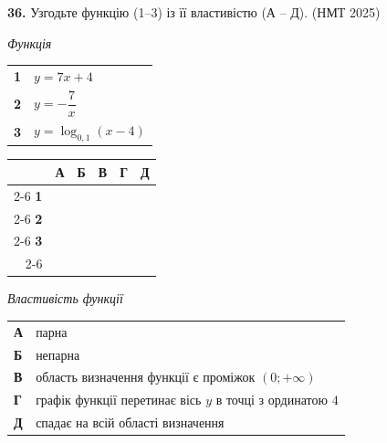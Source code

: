 \documentclass[14pt]{extarticle}
\newcommand{\nmtyear}[1]{\hfill{\small\color{yearcolor}(НМТ #1)}}
\begin{document}
\vspace{0.7cm}

\noindent\textbf{36.} Узгодьте функцію (1–3) із її властивістю (А – Д). \nmtyear{2025}

\vspace{0.3cm}

\noindent
\begin{minipage}[t]{0.45\textwidth}
    \textit{Функція} \par \vspace{0.2cm}
    \begin{tabular}{@{}p{0.5cm} p{5cm}@{}}
    \textbf{1} & $y=7x+4$ \\[0.3cm]
    \textbf{2} & $y=-\dfrac{7}{x}$ \\[0.3cm]
    \textbf{3} & $y=\log_{0{,}1}(x-4)$ \\
    \end{tabular}
    
    \vspace{0.5cm}
    
    \begingroup
    \setlength{\tabcolsep}{4pt}
    \renewcommand{\arraystretch}{1.2}
    \small
    \begin{tabular}{r|c|c|c|c|c|}
         \multicolumn{1}{c}{} & \multicolumn{1}{c}{\textbf{А}} & \multicolumn{1}{c}{\textbf{Б}} & \multicolumn{1}{c}{\textbf{В}} & \multicolumn{1}{c}{\textbf{Г}} & \multicolumn{1}{c}{\textbf{Д}} \\ \cline{2-6}
         \textbf{1} & & & & & \\ \cline{2-6}
         \textbf{2} & & & & & \\ \cline{2-6}
         \textbf{3} & & & & & \\ \cline{2-6}
    \end{tabular}
    \endgroup
\end{minipage}%
\hfill
\begin{minipage}[t]{0.50\textwidth}
    \textit{Властивість функції} \par \vspace{0.2cm}
    \begin{tabular}{@{}p{0.5cm} p{7.5cm}@{}}
    \textbf{А} & парна \\[0.3cm]
    \textbf{Б} & непарна \\[0.3cm]
    \textbf{В} & область визначення функції є проміжок $(0; +\infty)$ \\[0.3cm]
    \textbf{Г} & графік функції перетинає вісь $y$ в точці з ординатою $4$ \\[0.3cm]
    \textbf{Д} & спадає на всій області визначення \\
    \end{tabular}
\end{minipage}
\vspace{0.7cm}
\end{document}

